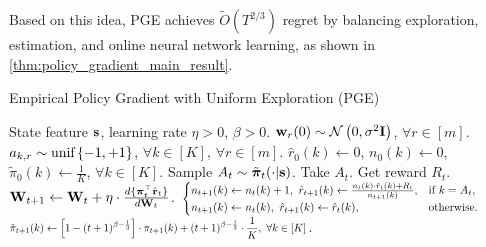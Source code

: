 Based on this idea, PGE achieves $\tilde{O}(T^{2/3})$ regret by balancing exploration, estimation, and online neural network learning, as shown in \cref{thm:policy_gradient_main_result}.

\begin{algorithm}[t]
\caption{Empirical Policy Gradient with Uniform Exploration (PGE)}
\label{alg:policy_gradient_uniform_exploration}
\begin{algorithmic}
    State feature ${\mathbf{s}}$, learning rate $\eta > 0$, $\beta > 0$.
   \STATE ${\mathbf{w}}_r(0) \sim {\mathcal{N}}\left( 0, \sigma^2 {\mathbf{I}} \right)$, $\forall r \in [m]$. $a_{k, r} \sim 
   {\text{unif}}\left\{-1, +1\right\}$, $\forall k \in [K]$, $\forall r \in [m]$.
   \STATE $\hat{r}_{0}(k) \gets 0$, $n_{0}(k) \gets 0$, $\tilde{\pi}_0(k) \gets \frac{1}{K}$, $\forall k \in [K]$.
   \STATE Sample $A_{t} \sim \tilde{{\boldsymbol{\pi}}}_{t}(\cdot | {\mathbf{s}} )$. Take $A_{t}$. Get reward $R_{t}$.
   \STATE ${\mathbf{W}}_{t+1} \leftarrow {\mathbf{W}}_t + \eta \cdot \frac{d \{ {\boldsymbol{\pi}}_t^\top \hat{{\mathbf{r}}}_t \} }{d {\mathbf{W}}_t}$.
   \STATE $\scalemath{0.8}{ \left. 
		\begin{cases}
		n_{t+1}(k) \gets  n_{t}(k) + 1, \ \hat{r}_{t+1}(k) \gets \frac{n_{t}(k) \cdot \hat{r}_{t}(k) + R_{t} }{n_{t+1}(k)},  & \text{if } k = A_t, \\
		n_{t+1}(k) \gets n_{t}(k), \ \hat{r}_{t+1}(k) \gets \hat{r}_{t}(k),  & \text{otherwise}.
		\end{cases}
		\right.}$ 
   \STATE $\scalemath{0.75}{ \tilde{\pi}_{t+1}(k) \gets \left[ 1 - (t+1)^{ \beta - \frac{1}{3} } \right] \cdot  \pi_{t+1}(k) + (t+1)^{ \beta - \frac{1}{3} }  \cdot \frac{1}{K}, \ \forall k \in [K] }$.
   \ENDFOR
\end{algorithmic}
\end{algorithm}

